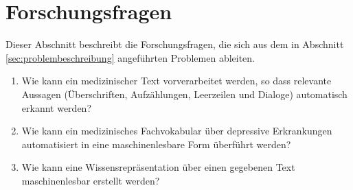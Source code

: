 \section{Forschungsfragen}
\label{sec:forschungsfragen}

Dieser Abschnitt beschreibt die Forschungsfragen, die sich aus dem in Abschnitt \ref{sec:problembeschreibung} angeführten Problemen ableiten.


\begin{enumerate}[label=FF \arabic*]
\item Wie kann ein medizinischer Text vorverarbeitet werden, so dass relevante Aussagen (Überschriften, Aufzählungen, Leerzeilen und Dialoge) automatisch erkannt werden?
\item Wie kann ein medizinisches Fachvokabular über depressive Erkrankungen automatisiert in eine maschinenlesbare Form überführt werden?
\item Wie kann eine Wissensrepräsentation über einen gegebenen Text maschinenlesbar erstellt werden?
\end{enumerate}




